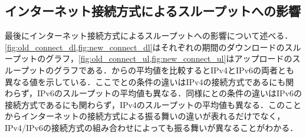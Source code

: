 \subsection{インターネット接続方式によるスループットへの影響}
最後にインターネット接続方式によるスループットへの影響について述べる．\cref{fig:old_connect_dl,fig:new_connect_dl}はそれぞれの期間のダウンロードのスループットのグラフ，\cref{fig:old_connect_ul,fig:new_connect_ul}はアップロードのスループットのグラフである．からの平均値を比較するとIPv4とIPv6の両者とも異なる値を示している．ここでとの条件の違いはIPv4の接続方式であるにも関わらず，IPv6のスループットの平均値も異なる．同様にとの条件の違いはIPv6の接続方式であるにも関わらず，IPv4のスループットの平均値も異なる．このことからインターネットの接続方式による振る舞いの違いが表れるだけでなく，IPv4/IPv6の接続方式の組み合わせによっても振る舞いが異なることがわかる．

